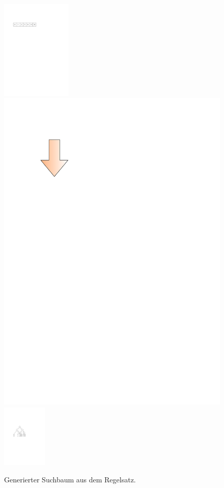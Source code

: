 \documentclass[xcolor=x11names,compress]{beamer}
\renewcommand{\(}{\begin{columns}}
\renewcommand{\)}{\end{columns}}
\newcommand{\<}[1]{\begin{column}{#1}}
\renewcommand{\>}{\end{column}}
\begin{document}
\begin{frame}
  \begin{figure}
  \centering
  \includegraphics[width=0.3\textwidth]{figures/array}
  \vfill
  \includegraphics[height=0.2\textheight]{figures/arrow_down}
  \vfill
  \includegraphics[height=3cm]{figures/bv-tree-simple}
  \caption{Generierter Suchbaum aus dem Regelsatz.}
  \end{figure}
\end{frame}
\end{document}
